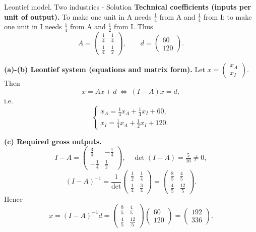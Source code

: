 \documentclass[9pt]{beamer}
\begin{document}
\begin{frame}{Leontief model. Two industries - Solution}
\small
\textbf{Technical coefficients (inputs per unit of output).}
To make one unit in A needs $\tfrac14$ from A and $\tfrac14$ from I; to make one unit in I needs $\tfrac14$ from A and $\tfrac12$ from I. Thus
\[
A=\begin{pmatrix}
\frac14 & \frac14\\[4pt]
\frac14 & \frac12
\end{pmatrix},\qquad
d=\begin{pmatrix}60\\[2pt]120\end{pmatrix}.
\]

\textbf{(a)-(b) Leontief system (equations and matrix form).}
Let $x=\begin{pmatrix}x_A\\ x_I\end{pmatrix}$. Then
\[
x=Ax+d
\ \Longleftrightarrow\
(I-A)x=d,
\]
i.e.
\[
\begin{cases}
x_A=\tfrac14 x_A+\tfrac14 x_I+60,\\[2pt]
x_I=\tfrac14 x_A+\tfrac12 x_I+120.
\end{cases}
\]

\textbf{(c) Required gross outputs.}
\[
I-A=\begin{pmatrix}\tfrac34&-\tfrac14\\[2pt]-\tfrac14&\tfrac12\end{pmatrix},
\quad
\det(I-A)=\tfrac{5}{16}\neq0,
\]
\[
(I-A)^{-1}
=\frac{1}{\det}\begin{pmatrix}\tfrac12&\tfrac14\\[2pt]\tfrac14&\tfrac34\end{pmatrix}
=\begin{pmatrix}\tfrac{8}{5}&\tfrac{4}{5}\\[2pt]\tfrac{4}{5}&\tfrac{12}{5}\end{pmatrix}.
\]
Hence
\[
x=(I-A)^{-1}d
=\begin{pmatrix}\tfrac{8}{5}&\tfrac{4}{5}\\[2pt]\tfrac{4}{5}&\tfrac{12}{5}\end{pmatrix}
\begin{pmatrix}60\\[2pt]120\end{pmatrix}
=\begin{pmatrix}192\\[2pt]336\end{pmatrix}.
\]
\end{frame}
\end{document}
